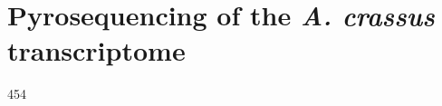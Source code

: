 
\chapter{Pyrosequencing of the \textit{A. crassus}
  transcriptome} %
\label{cha:pyro}




\ifpdf
    \graphicspath{{X/figures/PNG/}{X/figures/PDF/}{X/figures/}}
\else
    \graphicspath{{X/figures/EPS/}{X/figures/}}
\fi


454 








